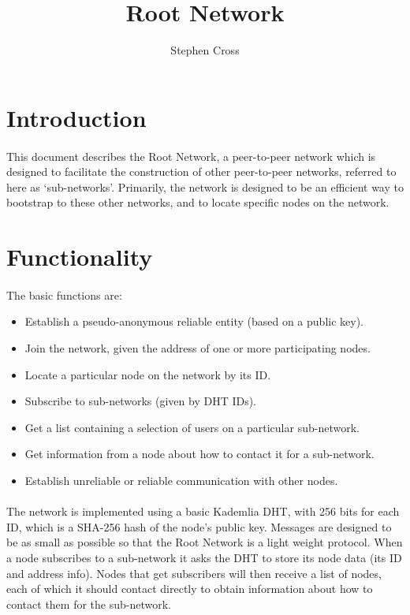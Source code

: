 \documentclass{article}
\title{Root Network}
\author{Stephen Cross}
\date{}
\begin{document}
\maketitle

\section{Introduction}

\paragraph{}
This document describes the Root Network, a peer-to-peer network which is designed to facilitate the construction of other peer-to-peer networks, referred to here as `sub-networks'. Primarily, the network is designed to be an efficient way to bootstrap to these other networks, and to locate specific nodes on the network.

\section{Functionality}

\paragraph{}
The basic functions are:

\begin{itemize}
\item Establish a pseudo-anonymous reliable entity (based on a public key).
\item Join the network, given the address of one or more participating nodes.
\item Locate a particular node on the network by its ID.
\item Subscribe to sub-networks (given by DHT IDs).
\item Get a list containing a selection of users on a particular sub-network.
\item Get information from a node about how to contact it for a sub-network.
\item Establish unreliable or reliable communication with other nodes.
\end{itemize}

\paragraph{}
The network is implemented using a basic Kademlia DHT, with 256 bits for each ID, which is a SHA-256 hash of the node's public key. Messages are designed to be as small as possible so that the Root Network is a light weight protocol. When a node subscribes to a sub-network it asks the DHT to store its node data (its ID and address info). Nodes that get subscribers will then receive a list of nodes, each of which it should contact directly to obtain information about how to contact them for the sub-network.
\end{document}

